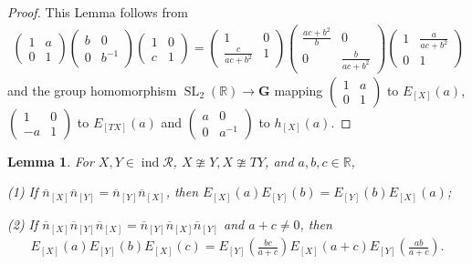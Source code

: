 \documentclass[12pt]{amsart}
\newtheorem{lemma}[theorem]{Lemma}
\begin{document}
\begin{proof}
    This Lemma follows from 
    \begin{align*}
        \begin{pmatrix}
            1 & a \\ 0 & 1 
        \end{pmatrix}
        \begin{pmatrix}
            b & 0 \\ 0 & b^{-1}
        \end{pmatrix}
        \begin{pmatrix}
            1 & 0 \\ c & 1
        \end{pmatrix} 
        = 
        \begin{pmatrix}
            1 & 0 \\ \frac{c}{ac+b^2} & 1
        \end{pmatrix}
        \begin{pmatrix}
            \frac{ac+b^2}{b} & 0 \\ 0 & \frac{b}{ac+b^2}
        \end{pmatrix}
        \begin{pmatrix}
            1 & \frac{a}{ac+b^2} \\ 0 & 1
        \end{pmatrix}
    \end{align*}
    and the group homomorphism $\operatorname{SL}_2(\mathbb{R})\rightarrow \mathbf{G}$ mapping $\begin{pmatrix}
            1 & a \\ 0 & 1 
        \end{pmatrix}$ to $E_{[X]}(a)$, $\begin{pmatrix}
            1 & 0 \\ -a & 1
        \end{pmatrix} $ to $E_{[TX]}(a)$ and $\begin{pmatrix}
            a & 0 \\ 0 & a^{-1}
        \end{pmatrix}$ to $h_{[X]}(a)$.
\end{proof}

\begin{lemma}
    For $X,Y\in \operatorname{ind}\mathcal{R}$, $X\ncong Y,X\ncong TY$, and $a,b,c\in \mathbb{R}$, 

    (1) If $\overline{n}_{[X]}\overline{n}_{[Y]}=\overline{n}_{[Y]}\overline{n}_{[X]}$, then $E_{[X]}(a)E_{[Y]}(b)=E_{[Y]}(b)E_{[X]}(a)$;

    (2) If $\overline{n}_{[X]}\overline{n}_{[Y]}\overline{n}_{[X]}=\overline{n}_{[Y]}\overline{n}_{[X]}\overline{n}_{[Y]}$ and $a+c\neq 0$, then 
    \begin{align*}
        E_{[X]}(a) E_{[Y]}(b) E_{[X]}(c) = E_{[Y]}(\frac{bc}{a+c}) E_{[X]}(a+c) E_{[Y]}(\frac{ab}{a+c}).
    \end{align*}
\end{lemma}
\end{document}
